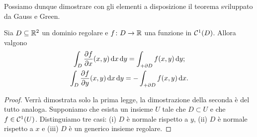 Possiamo dunque dimostrare con gli elementi a disposizione il teorema sviluppato da Gauss e Green.
\begin{teorema} \label{t:gauss-green}
	Sia $D\subseteq\mathbb{R}^2$ un dominio regolare e $f\colon D\to\mathbb{R}$ una funzione in $\mathcal{C}^{{1}}(D)$.
	Allora valgono
	\begin{gather}
		\int_D\frac{\partial {f}}{\partial {x}}(x,y)\,\textup{d} x\,\textup{d} y=\int_{+\partial D}f(x,y)\,\textup{d} y;
		\label{eq:gauss-green-y}\\
		\int_D\frac{\partial {f}}{\partial {y}}(x,y)\,\textup{d} x\,\textup{d} y=-\int_{+\partial D}f(x,y)\,\textup{d} x.
		\label{eq:gauss-green-x}
	\end{gather}
\end{teorema}
\begin{proof}
	Verrà dimostrata solo la prima legge, la dimostrazione della seconda è del tutto analoga.
	Supponiamo che esista un insieme $U$ tale che $D\subset U$ e che $f\in\mathcal{C}^{{1}}(U)$.
	Distinguiamo tre casi: (i) $D$ è normale rispetto a $y$, (ii) $D$ è normale rispetto a $x$ e (iii) $D$ è un generico insieme regolare.


\end{proof}
